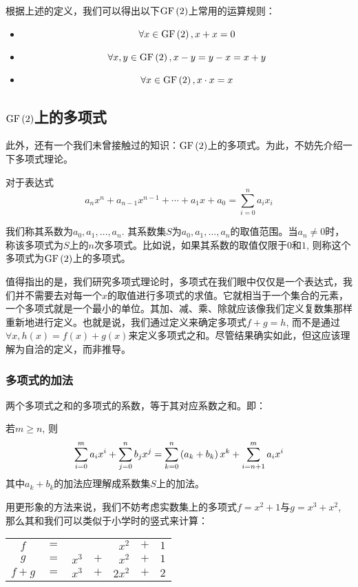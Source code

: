 根据上述的定义，我们可以得出以下$\mathrm{GF}\left( {2}\right)$上常用的运算规则：
\begin{itemize}
    \item 
        \begin{equation}
            \forall x\in\mathrm{GF}\left( {2}\right), x+x=0
        \end{equation}
    \item 
        \begin{equation}
            \forall x, y\in\mathrm{GF}\left( {2}\right), x-y=y-x=x+y
        \end{equation}
    \item 
        \begin{equation}
            \forall x\in\mathrm{GF}\left( {2}\right), x\cdot x=x
        \end{equation}
\end{itemize}
\subsection{$\mathrm{GF}\left( {2}\right)$上的多项式}
此外，还有一个我们未曾接触过的知识：$\mathrm{GF}\left( {2}\right)$上的多项式。为此，不妨先介绍一下多项式理论。\par
对于表达式
\begin{equation}
    a_nx^n+a_{n-1}x^{n-1}+\cdots +a_1x+a_0=\sum_{i=0}^na_ix_i
\end{equation}

我们称其系数为$a_0, a_1,\ldots, a_n$. 其系数集$S$为$a_0, a_1,\ldots ,a_n$的取值范围。当$a_n\neq 0$时，称该多项式为$S$上的$n$次多项式。比如说，如果其系数的取值仅限于$0$和$1$, 则称这个多项式为$\mathrm{GF}\left( {2}\right)$上的多项式。\par
值得指出的是，我们研究多项式理论时，多项式在我们眼中仅仅是一个表达式，我们并不需要去对每一个$x$的取值进行多项式的求值。它就相当于一个集合的元素，一个多项式就是一个最小的单位。其加、减、乘、除就应该像我们定义复数集那样重新地进行定义。也就是说，我们通过定义来确定多项式$f+g=h$, 而不是通过$\forall x, h(x)=f(x)+g(x)$来定义多项式之和。尽管结果确实如此，但这应该理解为自洽的定义，而非推导。\par
\subsubsection{多项式的加法}
两个多项式之和的多项式的系数，等于其对应系数之和。即：\par
若$m\geq n$, 则
\begin{equation}
    \sum_{i=0}^ma_ix^i+\sum_{j=0}^nb_jx^j=\sum_{k=0}^n\left( {a_k+b_k}\right)x^k+\sum_{i=n+1}^ma_ix^i
\end{equation}
其中$a_k+b_k$的加法应理解成系数集$S$上的加法。\par
用更形象的方法来说，我们不妨考虑实数集上的多项式$f=x^2+1$与$g=x^3+x^2$, 那么其和我们可以类似于小学时的竖式来计算：
\begin{table}[H]
    \centering
    \begin{tabular}{ccrcrcr}
        $f$&$=$&&&$x^2$&$+$&$1$\\
        $g$&$=$&$x^3$&$+$&$x^2$&$+$&$1$\\\hline
        $f+g$&$=$&$x^3$&$+$&$2x^2$&$+$&$2$
    \end{tabular}
\end{table}

